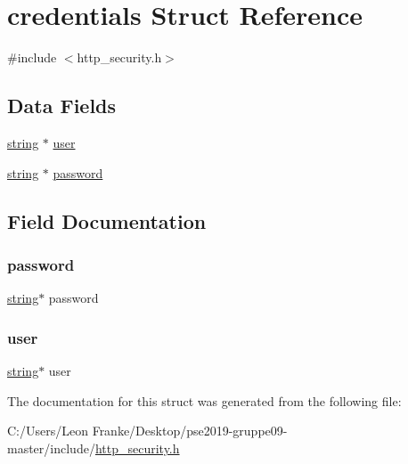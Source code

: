 \hypertarget{structcredentials}{}\section{credentials Struct Reference}
\label{structcredentials}


{\ttfamily \#include $<$http\+\_\+security.\+h$>$}

\subsection*{Data Fields}
\begin{DoxyCompactItemize}
\item 
\mbox{\hyperlink{structstring}{string}} $\ast$ \mbox{\hyperlink{structcredentials_a7888deb4669b9e03901c9701be5ef97a}{user}}
\item 
\mbox{\hyperlink{structstring}{string}} $\ast$ \mbox{\hyperlink{structcredentials_afceb07e734928763ff1beaf68ff41932}{password}}
\end{DoxyCompactItemize}


\subsection{Field Documentation}
\mbox{\label{structcredentials_afceb07e734928763ff1beaf68ff41932}} 
\subsubsection{\texorpdfstring{password}{password}}
{\footnotesize\ttfamily \mbox{\hyperlink{structstring}{string}}$\ast$ password}

\mbox{\label{structcredentials_a7888deb4669b9e03901c9701be5ef97a}} 
\subsubsection{\texorpdfstring{user}{user}}
{\footnotesize\ttfamily \mbox{\hyperlink{structstring}{string}}$\ast$ user}



The documentation for this struct was generated from the following file\+:\begin{DoxyCompactItemize}
\item 
C\+:/\+Users/\+Leon Franke/\+Desktop/pse2019-\/gruppe09-\/master/include/\mbox{\hyperlink{http__security_8h}{http\+\_\+security.\+h}}\end{DoxyCompactItemize}

